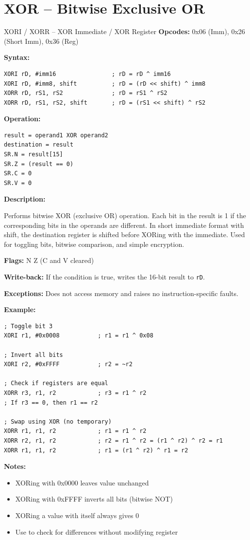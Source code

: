 \section{XOR -- Bitwise Exclusive OR}

\begin{instructionbox}{XORI / XORR -- XOR Immediate / XOR Register}
	\textbf{Opcodes:} 0x06 (Imm), 0x26 (Short Imm), 0x36 (Reg)

	\textbf{Syntax:}
	\begin{lstlisting}
XORI rD, #imm16                ; rD = rD ^ imm16
XORI rD, #imm8, shift          ; rD = (rD << shift) ^ imm8
XORR rD, rS1, rS2              ; rD = rS1 ^ rS2
XORR rD, rS1, rS2, shift       ; rD = (rS1 << shift) ^ rS2
\end{lstlisting}

	\textbf{Operation:}
	\begin{verbatim}
result = operand1 XOR operand2
destination = result
SR.N = result[15]
SR.Z = (result == 0)
SR.C = 0
SR.V = 0
\end{verbatim}

	\textbf{Description:}

	Performs bitwise XOR (exclusive OR) operation. Each bit in the result is 1 if the corresponding bits in the operands
	are different. In short immediate format with shift, the destination register is shifted before XORing with the
	immediate. Used for toggling bits, bitwise comparison, and simple encryption.

	\textbf{Flags:} N Z (C and V cleared)

	\textbf{Write-back:} If the condition is true, writes the 16-bit result to \texttt{rD}.

	\textbf{Exceptions:} Does not access memory and raises no instruction-specific faults.

	\textbf{Example:}
	\begin{lstlisting}
; Toggle bit 3
XORI r1, #0x0008           ; r1 = r1 ^ 0x08

; Invert all bits
XORI r2, #0xFFFF           ; r2 = ~r2

; Check if registers are equal
XORR r3, r1, r2            ; r3 = r1 ^ r2
; If r3 == 0, then r1 == r2

; Swap using XOR (no temporary)
XORR r1, r1, r2            ; r1 = r1 ^ r2
XORR r2, r1, r2            ; r2 = r1 ^ r2 = (r1 ^ r2) ^ r2 = r1
XORR r1, r1, r2            ; r1 = (r1 ^ r2) ^ r1 = r2
\end{lstlisting}

	\textbf{Notes:}
	\begin{itemize}
		\item XORing with 0x0000 leaves value unchanged
		\item XORing with 0xFFFF inverts all bits (bitwise NOT)
		\item XORing a value with itself always gives 0
		\item Use  to check for differences without modifying register
	\end{itemize}
\end{instructionbox}

